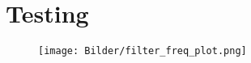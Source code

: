 \section{Testing}
\label{testing}

\begin{figure}[H]
    \centering
    \texttt{[image: Bilder/filter\_freq\_plot.png]}
\end{figure}

